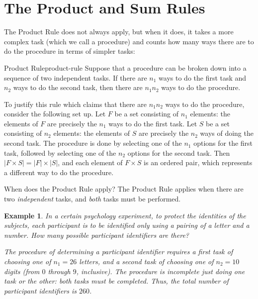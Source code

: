 \documentclass{book}
\newcounter{ekcounter}%
\theoremstyle{ekimcustom}
\newtheorem{example}[ekcounter]{Example}
\begin{document}
\section{The Product and Sum Rules}\label{section:basic-counting}

The Product Rule does not always apply, but when it does, it takes a more complex task (which we call a procedure) and counts how many ways there are to do the procedure in terms of simpler tasks:
\begin{bmethod}{Product Rule}{product-rule}
Suppose that a procedure can be broken down into a sequence of two independent tasks. If there are $n_1$ ways to do the first task and $n_2$ ways to do the second task, then there are $n_1n_2$ ways to do the procedure.
\end{bmethod}

To justify this rule which claims that there are $n_1n_2$ ways to do the procedure, consider the following set up. Let $F$ be a set consisting of $n_1$ elements: the elements of $F$ are precisely the $n_1$ ways to do the first task. Let $S$ be a set consisting of $n_2$ elements: the elements of $S$ are precisely the $n_2$ ways of doing the second task. The procedure is done by selecting one of the $n_1$ options for the first task, followed by selecting one of the $n_2$ options for the second task. Then $|F \times S| = |F| \times |S|$, and each element of $F \times S$ is an ordered pair, which represents a different way to do the procedure.

When does the Product Rule apply? The Product Rule applies when there are two \emph{independent} tasks, and \emph{both} tasks must be performed.

\begin{example}\label{example:letter-number}
In a certain psychology experiment, to protect the identities of the subjects, each participant is to be identified only using a pairing of a letter and a number. How many possible participant identifiers are there?

The procedure of determining a participant identifier requires a first task of choosing one of $n_1=26$ letters, and a second task of choosing one of $n_2=10$ digits (from $0$ through $9$, inclusive). The procedure is incomplete just doing one task or the other: both tasks must be completed. Thus, the total number of participant identifiers is $260$.
\end{example}
\end{document}
